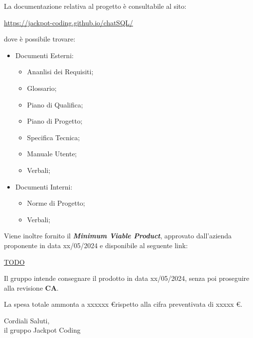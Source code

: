 \documentclass[5pt]{article}
\begin{document}
\begin{flushleft}
La documentazione relativa al progetto è consultabile al sito:
\begin{center}
	\href{https://jackpot-coding.github.io/chatSQL/}{https://jackpot-coding.github.io/chatSQL/}
\end{center}
dove è possibile trovare:
\begin{itemize}
	\item Documenti Esterni:
	\begin{itemize}
		\item Ananlisi dei Requisiti;
		\item Glossario;
		\item Piano di Qualifica;
		\item Piano di Progetto;
		\item Specifica Tecnica;
		\item Manuale Utente;
		\item Verbali;
	\end{itemize}
	\item Documenti Interni:
	\begin{itemize}
		\item Norme di Progetto;
		\item Verbali;
	\end{itemize}
\end{itemize}
\end{flushleft}

\begin{flushleft}
Viene inoltre fornito il \textbf{\textit{Minimum Viable Product}}, approvato dall'azienda proponente in data xx/05/2024 e disponibile al seguente link:
\begin{center}
	\href{https://github.com/Jackpot-Coding}{TODO}
\end{center}
\end{flushleft}

\begin{flushleft}
Il gruppo intende consegnare il prodotto in data xx/05/2024, senza poi proseguire alla revisione \textbf{CA}.

La spesa totale ammonta a xxxxxx \euro rispetto alla cifra preventivata di xxxxx \euro.
\end{flushleft}

\vspace{8mm}

\begin{flushright}
	Cordiali Saluti,\\
	il gruppo Jackpot Coding
\end{flushright}
	
\end{document}
